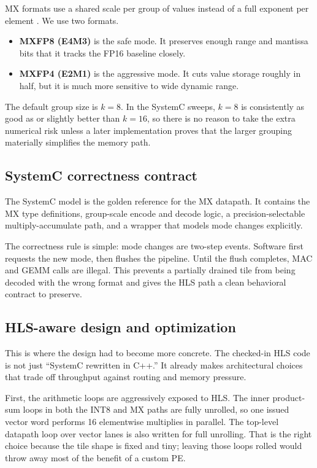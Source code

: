 \documentclass[11pt,a4paper]{article}
\begin{document}
MX formats use a shared scale per group of values instead of a full exponent per element \citep{rouhani2023mxformat}. We use two formats.

\begin{itemize}    \item \textbf{MXFP8 (E4M3)} is the safe mode. It preserves enough range and mantissa bits that it tracks the FP16 baseline closely.
    \item \textbf{MXFP4 (E2M1)} is the aggressive mode. It cuts value storage roughly in half, but it is much more sensitive to wide dynamic range.
\end{itemize}

The default group size is \(k=8\). In the SystemC sweeps, \(k=8\) is consistently as good as or slightly better than \(k=16\), so there is no reason to take the extra numerical risk unless a later implementation proves that the larger grouping materially simplifies the memory path.

\subsection{SystemC correctness contract}

The SystemC model is the golden reference for the MX datapath. It contains the MX type definitions, group-scale encode and decode logic, a precision-selectable multiply-accumulate path, and a wrapper that models mode changes explicitly.

The correctness rule is simple: mode changes are two-step events. Software first requests the new mode, then flushes the pipeline. Until the flush completes, MAC and GEMM calls are illegal. This prevents a partially drained tile from being decoded with the wrong format and gives the HLS path a clean behavioral contract to preserve.

\subsection{HLS-aware design and optimization}

This is where the design had to become more concrete. The checked-in HLS code is not just ``SystemC rewritten in C++.'' It already makes architectural choices that trade off throughput against routing and memory pressure.

First, the arithmetic loops are aggressively exposed to HLS. The inner product-sum loops in both the INT8 and MX paths are fully unrolled, so one issued vector word performs 16 elementwise multiplies in parallel. The top-level datapath loop over vector lanes is also written for full unrolling. That is the right choice because the tile shape is fixed and tiny; leaving those loops rolled would throw away most of the benefit of a custom PE.
\end{document}

